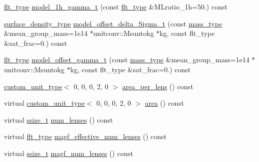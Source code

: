 \begin{DoxyCompactItemize}
\item 
\hyperlink{lib_2IceBRG__main_2common_8h_ad0f130a56eeb944d9ef2692ee881ecc4}{flt\+\_\+type} \hyperlink{classIceBRG_1_1pair__bin__summary_ae0e5c883d7c00ffcd745c9b53e9fcc70}{model\+\_\+1h\+\_\+gamma\+\_\+t} (const \hyperlink{lib_2IceBRG__main_2common_8h_ad0f130a56eeb944d9ef2692ee881ecc4}{flt\+\_\+type} \&M\+Lratio\+\_\+1h=50.) const 
\item 
\hyperlink{namespaceIceBRG_a80c597ef5ba0a32491d32a9f0083b02d}{surface\+\_\+density\+\_\+type} \hyperlink{classIceBRG_1_1pair__bin__summary_a9b5aa9cbf8b82c11c9e70b585149bb47}{model\+\_\+offset\+\_\+delta\+\_\+\+Sigma\+\_\+t} (const \hyperlink{namespaceIceBRG_a1be72ac4918a9b029f2eefa084213e35}{mass\+\_\+type} \&mean\+\_\+group\+\_\+mass=1e14 $\ast$unitconv\+::\+Msuntokg $\ast$kg, const flt\+\_\+type \&sat\+\_\+frac=0.) const 
\item 
\hyperlink{lib_2IceBRG__main_2common_8h_ad0f130a56eeb944d9ef2692ee881ecc4}{flt\+\_\+type} \hyperlink{classIceBRG_1_1pair__bin__summary_a2f539a8860a38bee4e54bdc27f53faaa}{model\+\_\+offset\+\_\+gamma\+\_\+t} (const \hyperlink{namespaceIceBRG_a1be72ac4918a9b029f2eefa084213e35}{mass\+\_\+type} \&mean\+\_\+group\+\_\+mass=1e14 $\ast$unitconv\+::\+Msuntokg $\ast$kg, const flt\+\_\+type \&sat\+\_\+frac=0.) const 
\item 
\hyperlink{namespaceIceBRG_a896bc1bf7e8db5ca045b9cf35912ca5e}{custom\+\_\+unit\+\_\+type}$<$ 0, 0, 0, 2, 0 $>$ \hyperlink{classIceBRG_1_1pair__bin__summary_a556037a76b545b5a453595d30fdd94a6}{area\+\_\+per\+\_\+lens} () const 
\item 
virtual \hyperlink{namespaceIceBRG_a896bc1bf7e8db5ca045b9cf35912ca5e}{custom\+\_\+unit\+\_\+type}$<$ 0, 0, 0, 2, 0 $>$ \hyperlink{classIceBRG_1_1pair__bin__summary_a6c0d9413d2cab3f09e96947dc08b6841}{area} () const 
\item 
virtual \hyperlink{lib_2IceBRG__main_2common_8h_ab322a3e50421dc5f0c43316b1b373592}{ssize\+\_\+t} \hyperlink{classIceBRG_1_1pair__bin__summary_a36cfa054426945727a7638c7831a7f04}{num\+\_\+lenses} () const 
\item 
virtual \hyperlink{lib_2IceBRG__main_2common_8h_ad0f130a56eeb944d9ef2692ee881ecc4}{flt\+\_\+type} \hyperlink{classIceBRG_1_1pair__bin__summary_a71592ca23d56860395e8fe22335098ff}{magf\+\_\+effective\+\_\+num\+\_\+lenses} () const 
\item 
virtual \hyperlink{lib_2IceBRG__main_2common_8h_ab322a3e50421dc5f0c43316b1b373592}{ssize\+\_\+t} \hyperlink{classIceBRG_1_1pair__bin__summary_a1df27276f9953ae8f6d25dabadcb563d}{magf\+\_\+num\+\_\+lenses} () const 

\end{DoxyCompactItemize}
